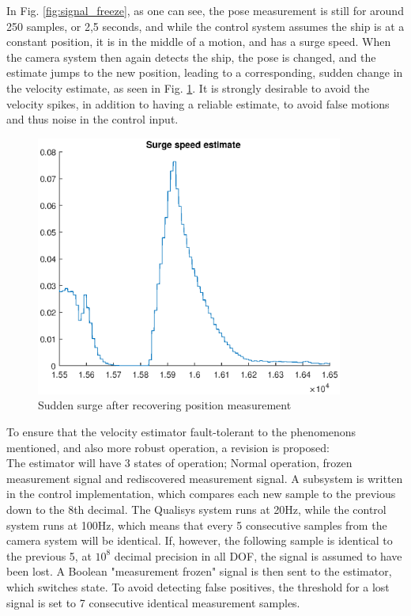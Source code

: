 In Fig. \ref{fig:signal_freeze}, as one can see, the pose measurement is still for around 250 samples, or 2,5 seconds, and while the control system assumes the ship is at a constant position, it is in the middle of a motion, and has a surge speed. When the camera system then again detects the ship, the pose is changed, and the estimate jumps to the new position, leading to a corresponding, sudden change in the velocity estimate, as seen in Fig. \ref{fig:surge_spike}. It is strongly desirable to avoid the velocity spikes, in addition to having a reliable estimate, to avoid false motions and thus noise in the control input. 

\begin{figure}[!h]
\centering
\includegraphics[width=0.9\textwidth]{plots/surge_spike.eps}
\caption{Sudden surge after recovering position measurement}
\label{fig:surge_spike}
\end{figure}

To ensure that the velocity estimator fault-tolerant to the phenomenons mentioned, and also more robust operation, a revision is proposed:\\ The estimator will have 3 states of operation; Normal operation, frozen measurement signal and rediscovered measurement signal. A subsystem is written in the control implementation, which compares each new sample to the previous down to the 8th decimal. The Qualisys system runs at 20Hz, while the control system runs at 100Hz, which means that every 5 consecutive samples from the camera system will be identical. If, however, the following sample is identical to the previous 5, at $10^8$ decimal precision in all DOF, the signal is assumed to have been lost. A Boolean "measurement frozen" signal is then sent to the estimator, which switches state. To avoid detecting false positives, the threshold for a lost signal is set to 7 consecutive identical measurement samples. 



